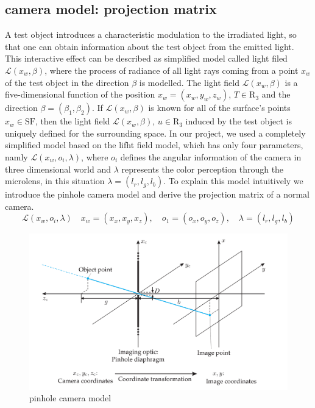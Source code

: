 \subsection{camera model: projection matrix}
A test object introduces a characteristic modulation to the irradiated light, so that one can obtain information about the test object from the emitted light.\cite{1400121} This interactive effect can be described as simplified model called light filed $\mathcal{L}(x_{w}, \beta)$, where the process of radiance of all light rays coming from a point $x_{w}$ of the test object in the direction $\beta$ is modelled. The light field $\mathcal{L}(x_{w}, \beta)$ is a five-dimensional function of the position $x_w = (x_w, y_w, z_w)$, $T \in \mathrm{R}_3$ and the direction $\beta = (\beta_1, \beta_2)$. If $\mathcal{L}(x_{w}, \beta)$ is known for all of the surface’s points $x_w \in \mathrm{SF}$, then the light field $\mathcal{L}(x_{w}, \beta)$, $u \in \mathrm{R}_3$ induced by the test object is uniquely defined for the surrounding space. In our project, we used a completely simplified model based on the lifht field model, which has only four parameters, namly $\mathcal{L}(x_{w}, o_i, \lambda)$, where $o_i$ defines the angular information of the camera in three dimensional world and $\lambda$ represents the color perception through the microlens, in this situation $\lambda = (l_r, l_g, l_b)$. To explain this model intuitively we introduce the pinhole camera model and derive the projection matrix of a normal camera. 
\begin{equation}
\label{eqn:lf_model1}
    \mathcal{L}(x_{w}, o_i, \lambda) \quad x_w=(x_x, x_y,x_z), \quad o_1 = (o_x, o_y, o_z), \quad \lambda = (l_r,l_g,l_b)
\end{equation}
\begin{figure}
\centering
\includegraphics[width=15cm]{images/camera_model.PNG}
\caption{pinhole camera model}
\label{fig:pinhole camera model}
\end{figure}

